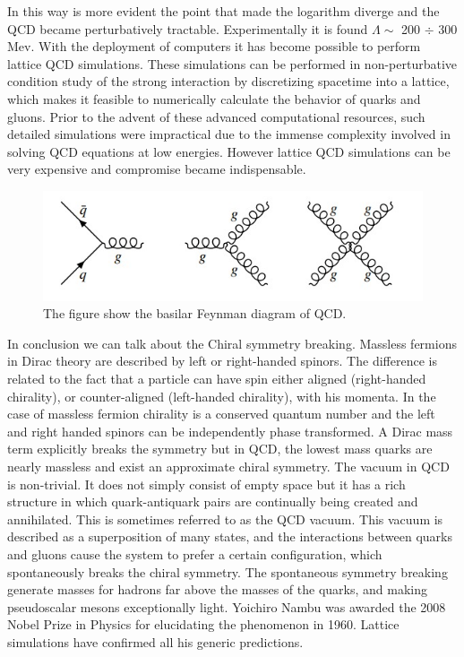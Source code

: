 \documentclass[12pt,a4paper]{book}
\begin{document}
	In this way is more evident the point that made the logarithm diverge and the QCD became perturbatively tractable. Experimentally it is found $\Lambda \sim$ 200 $\div$ 300 Mev.\cite{Semprini} 
	With the deployment of computers it has become possible to perform lattice QCD simulations. These simulations can be performed in non-perturbative condition study of the strong interaction by discretizing spacetime into a lattice, which makes it feasible to numerically calculate the behavior of quarks and gluons. Prior to the advent of these advanced computational resources, such detailed simulations were impractical due to the immense complexity involved in solving QCD equations at low energies. However lattice QCD simulations can be very expensive and compromise became indispensable. 
	
		\begin{figure}		
		\centering
		\includegraphics[width=0.7\linewidth]{pictures/QCD_vertices.jpeg}
		\caption{The figure show the basilar Feynman diagram of QCD.}
		\label{fig:QCD_vertices} 
	\end{figure}
	
	In conclusion we can talk about the Chiral symmetry breaking. Massless fermions in Dirac theory are described by left or right-handed spinors. The difference is related to the fact that a particle can have spin either aligned (right-handed chirality), or counter-aligned (left-handed chirality), with his momenta. In the case of massless fermion chirality is a conserved quantum number and the left and right handed spinors can be independently phase transformed. A Dirac mass term explicitly breaks the symmetry but in QCD, the lowest mass quarks are nearly massless and exist an approximate chiral symmetry. The vacuum in QCD is non-trivial. It does not simply consist of empty space but it has a rich structure in which quark-antiquark pairs are continually being created and annihilated. This is sometimes referred to as the QCD vacuum. This vacuum is described as a superposition of many states, and the interactions between quarks and gluons cause the system to prefer a certain configuration, which spontaneously breaks the chiral symmetry. The spontaneous symmetry breaking generate masses for hadrons far above the masses of the quarks, and making pseudoscalar mesons exceptionally light. Yoichiro Nambu was awarded the 2008 Nobel Prize in Physics for elucidating the phenomenon in 1960. Lattice simulations have confirmed all his generic predictions. \cite{Peskin:1995ev}
	
\end{document}
